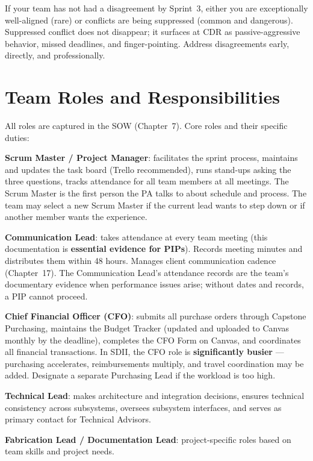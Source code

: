 \begin{tipbox}
If your team has not had a disagreement by Sprint~3, either you are exceptionally well-aligned (rare) or conflicts are being suppressed (common and dangerous). Suppressed conflict does not disappear; it surfaces at CDR as passive-aggressive behavior, missed deadlines, and finger-pointing. Address disagreements early, directly, and professionally.
\end{tipbox}

\section{Team Roles and Responsibilities}
All roles are captured in the SOW (Chapter~7). Core roles and their specific duties:

\textbf{Scrum Master / Project Manager}: facilitates the sprint process, maintains and updates the task board (Trello recommended), runs stand-ups asking the three questions, tracks attendance for all team members at all meetings. The Scrum Master is the first person the PA talks to about schedule and process. The team may select a new Scrum Master if the current lead wants to step down or if another member wants the experience.

\textbf{Communication Lead}: takes attendance at every team meeting (this documentation is \textbf{essential evidence for PIPs}). Records meeting minutes and distributes them within 48 hours. Manages client communication cadence (Chapter~17). The Communication Lead's attendance records are the team's documentary evidence when performance issues arise; without dates and records, a PIP cannot proceed.

\textbf{Chief Financial Officer (CFO)}: submits all purchase orders through Capstone Purchasing, maintains the Budget Tracker (updated and uploaded to Canvas monthly by the deadline), completes the CFO Form on Canvas, and coordinates all financial transactions. In SDII, the CFO role is \textbf{significantly busier} --- purchasing accelerates, reimbursements multiply, and travel coordination may be added. Designate a separate Purchasing Lead if the workload is too high.

\textbf{Technical Lead}: makes architecture and integration decisions, ensures technical consistency across subsystems, oversees subsystem interfaces, and serves as primary contact for Technical Advisors.

\textbf{Fabrication Lead / Documentation Lead}: project-specific roles based on team skills and project needs.

